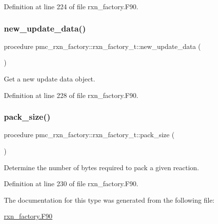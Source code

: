 Definition at line 224 of file rxn\+\_\+factory.\+F90.

\mbox{\label{structpmc__rxn__factory_1_1rxn__factory__t_a1ee2c4fcd1b457908a8df5ad18a302cd}} 
\subsubsection{\texorpdfstring{new\+\_\+update\+\_\+data()}{new\_update\_data()}}
{\footnotesize\ttfamily procedure pmc\+\_\+rxn\+\_\+factory\+::rxn\+\_\+factory\+\_\+t\+::new\+\_\+update\+\_\+data (\begin{DoxyParamCaption}{ }\end{DoxyParamCaption})\hspace{0.3cm}{\ttfamily [private]}}



Get a new update data object. 



Definition at line 228 of file rxn\+\_\+factory.\+F90.

\mbox{\label{structpmc__rxn__factory_1_1rxn__factory__t_a82b8d1f5b408d4ed30004629cb83b898}} 
\subsubsection{\texorpdfstring{pack\+\_\+size()}{pack\_size()}}
{\footnotesize\ttfamily procedure pmc\+\_\+rxn\+\_\+factory\+::rxn\+\_\+factory\+\_\+t\+::pack\+\_\+size (\begin{DoxyParamCaption}{ }\end{DoxyParamCaption})\hspace{0.3cm}{\ttfamily [private]}}



Determine the number of bytes required to pack a given reaction. 



Definition at line 230 of file rxn\+\_\+factory.\+F90.



The documentation for this type was generated from the following file\+:\begin{DoxyCompactItemize}
\item 
\mbox{\hyperlink{rxn__factory_8_f90}{rxn\+\_\+factory.\+F90}}\end{DoxyCompactItemize}
